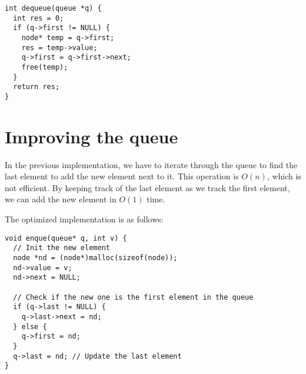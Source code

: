 \documentclass[a4paper,11pt]{article}
\begin{document}
\begin{verbatim}
int dequeue(queue *q) {
  int res = 0;
  if (q->first != NULL) {
    node* temp = q->first;
    res = temp->value;
    q->first = q->first->next;
    free(temp);  
  }
  return res;
}
\end{verbatim}

\section*{Improving the queue}

In the previous implementation, we have to iterate through the queue to find the 
last element to add the new element next to it. This operation is $O(n)$, which is
not efficient. By keeping track of the last element as we track the first element,
we can add the new element in $O(1)$ time.

The optimized implementation is as follows:

\begin{verbatim}
void enque(queue* q, int v) {
  // Init the new element
  node *nd = (node*)malloc(sizeof(node));
  nd->value = v;
  nd->next = NULL;

  // Check if the new one is the first element in the queue
  if (q->last != NULL) {
    q->last->next = nd;
  } else {
    q->first = nd;
  }
  q->last = nd; // Update the last element
}
\end{verbatim}
\end{document}
